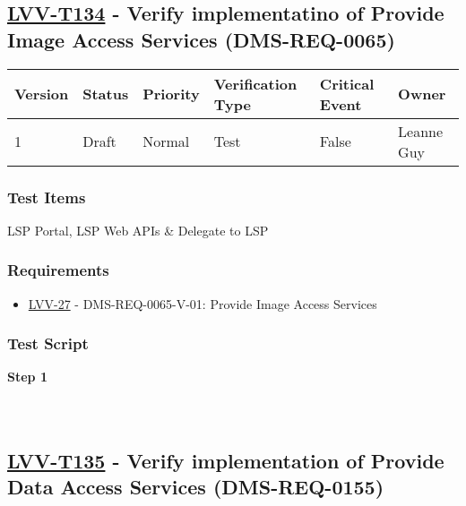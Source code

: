 \hypertarget{lvv-t134---verify-implementatino-of-provide-image-access-services-dms-req-0065}{%
\subsection{\texorpdfstring{\href{https://jira.lsstcorp.org/secure/Tests.jspa\#/testCase/LVV-T134}{LVV-T134}
- Verify implementatino of Provide Image Access Services
(DMS-REQ-0065)}{LVV-T134 - Verify implementatino of Provide Image Access Services (DMS-REQ-0065)}}\label{lvv-t134---verify-implementatino-of-provide-image-access-services-dms-req-0065}}

\begin{longtable}[]{@{}llllll@{}}
\toprule
Version & Status & Priority & Verification Type & Critical Event &
Owner\tabularnewline
\midrule
\endhead
1 & Draft & Normal & Test & False & Leanne Guy\tabularnewline
\bottomrule
\end{longtable}

\hypertarget{test-items-34}{%
\subsubsection{Test Items}\label{test-items-34}}

LSP Portal, LSP Web APIs \& Delegate to LSP

\hypertarget{requirements-34}{%
\subsubsection{Requirements}\label{requirements-34}}

\begin{itemize}
\tightlist
\item
  \href{https://jira.lsstcorp.org/browse/LVV-27}{LVV-27} -
  DMS-REQ-0065-V-01: Provide Image Access Services
\end{itemize}

\hypertarget{test-script-34}{%
\subsubsection{Test Script}\label{test-script-34}}

\textbf{Step 1}\\
~\\
~\\

\hypertarget{lvv-t135---verify-implementation-of-provide-data-access-services-dms-req-0155}{%
\subsection{\texorpdfstring{\href{https://jira.lsstcorp.org/secure/Tests.jspa\#/testCase/LVV-T135}{LVV-T135}
- Verify implementation of Provide Data Access Services
(DMS-REQ-0155)}{LVV-T135 - Verify implementation of Provide Data Access Services (DMS-REQ-0155)}}\label{lvv-t135---verify-implementation-of-provide-data-access-services-dms-req-0155}}

